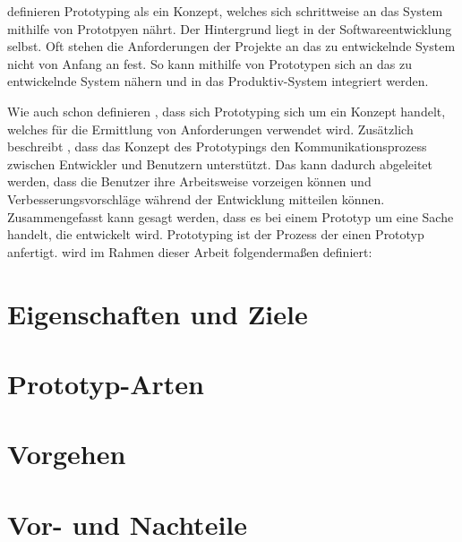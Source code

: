 
\citeauthor{Broy.2013} definieren Prototyping als ein Konzept, welches sich schrittweise an das System mithilfe von Prototpyen nährt. Der Hintergrund liegt in der Softwareentwicklung selbst. Oft stehen die Anforderungen der Projekte an das zu entwickelnde System nicht von Anfang an fest. So kann mithilfe von Prototypen sich an das zu entwickelnde System nähern und in das Produktiv-System integriert werden.


Wie auch schon \citeauthor{Broy.2013} definieren \citeauthor{Bleek.2002}, dass sich Prototyping sich um ein Konzept handelt, welches für die Ermittlung von Anforderungen verwendet wird. Zusätzlich beschreibt \citeauthor{Bleek.2002}, dass das Konzept des Prototypings den Kommunikationsprozess zwischen Entwickler und Benutzern unterstützt. Das kann dadurch abgeleitet werden, dass die Benutzer ihre Arbeitsweise vorzeigen können und Verbesserungsvorschläge während der Entwicklung mitteilen können. 
\abschnitt
Zusammengefasst kann gesagt werden, dass es bei einem Prototyp um eine Sache handelt, die entwickelt wird. Prototyping ist der Prozess der einen Prototyp anfertigt.
\abschnitt
{} wird im Rahmen dieser Arbeit folgendermaßen definiert: 


\section{Eigenschaften und Ziele} \label{prot:Eigenschaften}



\section{Prototyp-Arten} \label{prot:Prototyparten}


\section{Vorgehen} \label{prot:Prototyp_vorgehen}


\section{Vor- und Nachteile} \label{prot:Prototyp_vorteile}